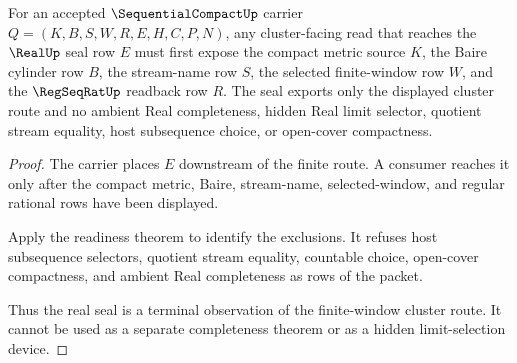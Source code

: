 \begin{theorem}
\label{thm:sequentialcompact-real-cluster-nonescape}
For an accepted $\SequentialCompactUp$ carrier $Q=(K,B,S,W,R,E,H,C,P,N)$, any cluster-facing read that reaches the $\RealUp$ seal row $E$ must first expose the compact metric source $K$, the Baire cylinder row $B$, the stream-name row $S$, the selected finite-window row $W$, and the $\RegSeqRatUp$ readback row $R$. The seal exports only the displayed cluster route and no ambient Real completeness, hidden Real limit selector, quotient stream equality, host subsequence choice, or open-cover compactness.
\end{theorem}
\begin{proof}
The carrier places $E$ downstream of the finite route. A consumer reaches it only after the compact metric, Baire, stream-name, selected-window, and regular rational rows have been displayed.

Apply the readiness theorem to identify the exclusions. It refuses host subsequence selectors, quotient stream equality, countable choice, open-cover compactness, and ambient Real completeness as rows of the packet.

Thus the real seal is a terminal observation of the finite-window cluster route. It cannot be used as a separate completeness theorem or as a hidden limit-selection device.
\end{proof}

